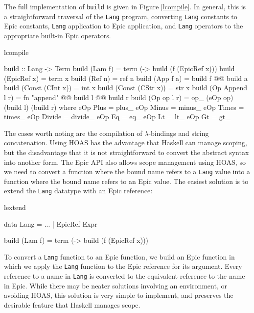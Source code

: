 \noindent
The full implementation of \texttt{build} is given in Figure \ref{lcompile}.
In general, this is a straightforward traversal of the \texttt{Lang}
program, converting \texttt{Lang} constants to Epic constants,
\texttt{Lang} application to Epic application, and \texttt{Lang}
operators to the appropriate built-in Epic operators. 
                  
\begin{SaveVerbatim}{lcompile}

build :: Lang -> Term
build (Lam f)          = term (\x -> build (f (EpicRef x)))
build (EpicRef x)      = term x
build (Ref n)          = ref n
build (App f a)        = build f @@ build a
build (Const (CInt x)) = int x
build (Const (CStr x)) = str x
build (Op Append l r)  = fn "append" @@ build l @@ build r
build (Op op l r)      = op_ (eOp op) (build l) (build r)
    where eOp Plus   = plus_
          eOp Minus  = minus_
          eOp Times  = times_
          eOp Divide = divide_
          eOp Eq     = eq_
          eOp Lt     = lt_
          eOp Gt     = gt_

\end{SaveVerbatim}

The cases worth noting are the compilation of $\lambda$-bindings and
string concatenation. Using HOAS has the advantage that Haskell can
manage scoping, but the disadvantage that it is not straightforward to
convert the abstract syntax into another form. The Epic API also
allows scope management using HOAS, so we need to convert a function
where the bound name refers to a \texttt{Lang} value into a function
where the bound name refers to an Epic value. The easiest solution is
to extend the \texttt{Lang} datatype with an Epic reference:

\begin{SaveVerbatim}{lextend}

data Lang = ...
          | EpicRef Expr

build (Lam f) = term (\x -> build (f (EpicRef x)))

\end{SaveVerbatim}

\noindent
To convert a \texttt{Lang} function to an Epic function, we build an
Epic function in which we apply the \texttt{Lang} function to the Epic
reference for its argument. Every reference to a name in \texttt{Lang}
is converted to the equivalent reference to the name in Epic. While
there may be neater solutions involving an environment, or avoiding
HOAS, this solution is very simple to implement, and preserves the
desirable feature that Haskell manages scope.


